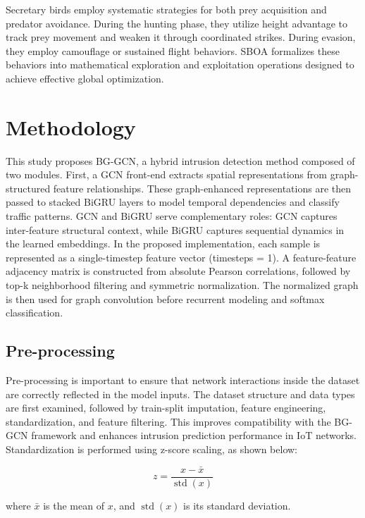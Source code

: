 \documentclass[a4paper,fleqn]{cas-sc}
\begin{document}
Secretary birds employ systematic strategies for both prey acquisition and predator avoidance. During the hunting phase, they utilize height advantage to track prey movement and weaken it through coordinated strikes. During evasion, they employ camouflage or sustained flight behaviors. SBOA formalizes these behaviors into mathematical exploration and exploitation operations designed to achieve effective global optimization.



\section{Methodology}\label{sec:methodology}

This study proposes BG-GCN, a hybrid intrusion detection method composed of two modules. First, a GCN front-end extracts spatial representations from graph-structured feature relationships. These graph-enhanced representations are then passed to stacked BiGRU layers to model temporal dependencies and classify traffic patterns.
GCN and BiGRU serve complementary roles: GCN captures inter-feature structural context, while BiGRU captures sequential dynamics in the learned embeddings. In the proposed implementation, each sample is represented as a single-timestep feature vector (timesteps = 1). A feature-feature adjacency matrix is constructed from absolute Pearson correlations, followed by top-k neighborhood filtering and symmetric normalization. The normalized graph is then used for graph convolution before recurrent modeling and softmax classification.

\subsection{Pre-processing}
Pre-processing is important to ensure that network interactions inside the dataset are correctly reflected in the model inputs. The dataset structure and data types are first examined, followed by train-split imputation, feature engineering, standardization, and feature filtering. This improves compatibility with the BG-GCN framework and enhances intrusion prediction performance in IoT networks. Standardization is performed using z-score scaling, as shown below:

\begin{equation}
z = \frac{x - \bar{x}}{\operatorname{std}(x)}
\end{equation}

where $\bar{x}$ is the mean of $x$, and $\operatorname{std}(x)$ is its standard deviation.
\end{document}
